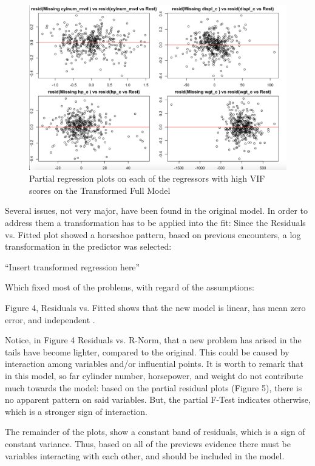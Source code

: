 \documentclass{article}
\begin{document}
\begin{figure}
	\centering
	\includegraphics[width=1\linewidth]{24-27t_PrRgall4}
	\caption[Partial regression plots on high VIF regressors on the Transformed Full Model]
	{Partial regression plots on each of the regressors with high VIF scores on the Transformed Full Model}
\end{figure}

\clearpage
\newpage

Several issues, not very major, have been found in the original model. In order to address them a transformation has to be applied into the fit: Since the Residuals vs. Fitted plot showed a horseshoe pattern, based on previous encounters, a log transformation in the predictor was selected:

“Insert transformed regression here”

 Which fixed most of the problems, with regard of the assumptions:
 
Figure 4, Residuals vs. Fitted shows that the new model  is linear, has mean zero error, and independent .


Notice, in Figure 4 Residuals vs. R-Norm, that a new problem has arised in the tails have become lighter, compared to the original.  This could be caused by interaction among variables and/or influential points. It is worth to remark that in this model, so far cylinder number, horsepower, and weight do not contribute much towards the model: based on the partial residual plots (Figure 5), there is no apparent pattern on said variables. But, the partial F-Test indicates otherwise, which is a stronger sign of interaction.

The remainder of the plots, show a constant band of residuals, which is a sign of constant variance. 
	 Thus, based on all of the previews evidence there must be variables interacting with each other, and should be included in the model. 
\end{document}
